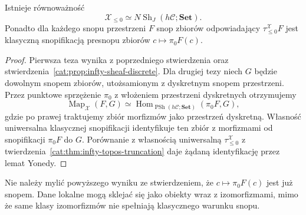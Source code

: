 \begin{wniosek}\label{cat:cor:infty-topos-classical-recovery}
Istnieje równoważność
\[
 \mathcal X_{\leq0}\simeq N\operatorname{Sh}_J(h\mathcal C;\mathbf{Set}).
\]
Ponadto dla każdego snopu przestrzeni $F$ snop zbiorów odpowiadający $\tau_{\leq0}^{\mathcal X}F$ jest klasyczną snopifikacją presnopu zbiorów $c\mapsto\pi_0 F(c)$.
\end{wniosek}
\begin{proof}
Pierwsza teza wynika z poprzedniego stwierdzenia oraz stwierdzenia~\ref{cat:prop:infty-sheaf-discrete}. Dla drugiej tezy niech $G$ będzie dowolnym snopem zbiorów, utożsamionym z dyskretnym snopem przestrzeni. Przez punktowe sprzężenie $\pi_0$ z włożeniem przestrzeni dyskretnych otrzymujemy
\[
 \operatorname{Map}_{\mathcal X}(F,G)
 \simeq \operatorname{Hom}_{\operatorname{PSh}(h\mathcal C;\mathbf{Set})}
       (\pi_0 F,G),
\]
gdzie po prawej traktujemy zbiór morfizmów jako przestrzeń dyskretną. Własność uniwersalna klasycznej snopifikacji identyfikuje ten zbiór z morfizmami od snopifikacji $\pi_0F$ do $G$. Porównanie z własnością uniwersalną $\tau_{\leq0}^{\mathcal X}$ z twierdzenia~\ref{cat:thm:infty-topos-truncation} daje żądaną identyfikację przez lemat Yonedy.
\end{proof}

Nie należy mylić powyższego wyniku ze stwierdzeniem, że $c\mapsto\pi_0F(c)$ jest już snopem. Dane lokalne mogą sklejać się jako obiekty wraz z izomorfizmami, mimo że same klasy izomorfizmów nie spełniają klasycznego warunku snopu.

